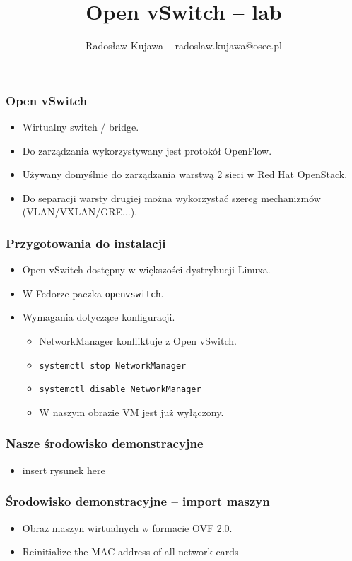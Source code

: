 \documentclass[dvipsnames,table]{beamer}
\title{Open vSwitch -- lab}
\author{Radosław Kujawa -- radoslaw.kujawa@osec.pl}
\institute{OSEC}
\begin{document}
\begin{frame}
	\titlepage
\end{frame}

\begin{frame}
\frametitle{Open vSwitch}
\begin{itemize}
	\item Wirtualny switch / bridge.
	\item Do zarządzania wykorzystywany jest protokół OpenFlow.
	\item Używany domyślnie do zarządzania warstwą 2 sieci w Red Hat OpenStack.
	\item Do separacji warsty drugiej można wykorzystać szereg mechanizmów (VLAN/VXLAN/GRE...).
\end{itemize}
\end{frame}

\begin{frame}
\frametitle{Przygotowania do instalacji}
\begin{itemize}
	\item Open vSwitch dostępny w większości dystrybucji Linuxa.
	\item W Fedorze paczka {\tt openvswitch}.
	\item Wymagania dotyczące konfiguracji.
	\begin{itemize}
		\item NetworkManager konfliktuje z Open vSwitch.
		\item {\tt systemctl stop NetworkManager}
		\item {\tt systemctl disable NetworkManager}
		\item W naszym obrazie VM jest już wyłączony.
	\end{itemize}
\end{itemize}
\end{frame}

\begin{frame}
\frametitle{Nasze środowisko demonstracyjne}
\begin{itemize}
	\item insert rysunek here 
\end{itemize}
\end{frame}

\begin{frame}
\frametitle{Środowisko demonstracyjne -- import maszyn}
\begin{itemize}
	\item Obraz maszyn wirtualnych w formacie OVF 2.0.
	\item Reinitialize the MAC address of all network cards 
\end{itemize}
\end{frame}
\end{document}
